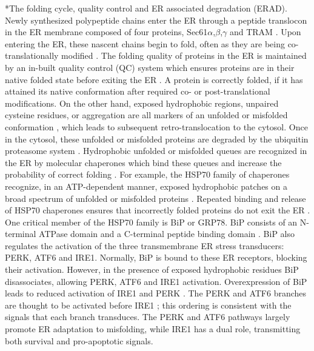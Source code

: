 \documentclass[12pt]{article}
\makeatletter
\renewcommand\subsection{\@startsection
	{subsection}{2}{0mm}
	{-0.05in}
	{-0.5\baselineskip}
	{\normalfont\normalsize\bfseries}}
\makeatother
\begin{document}
\subsection*{The folding cycle, quality control and ER associated degradation (ERAD).} 
Newly synthesized polypeptide chains enter the ER through a peptide translocon in the ER membrane composed of four proteins, Sec61$\alpha$,$\beta$,$\gamma$ and TRAM \citep{Matlack:1998kx}. 
Upon entering the ER, these nascent chains begin to fold, often as they are being co-translationally modified \citep{Fedorov:1997ys}. The folding quality of proteins in the ER is maintained by an in-built quality control (QC) system which ensures proteins are in their native folded state before exiting the ER \citep{ellgaard1999ssq,ellgaard2003qce}. A protein is correctly folded, if it has attained its native conformation after required co- or post-translational modifications. On the other hand, exposed hydrophobic regions, unpaired cysteine residues, or aggregation are all markers of an unfolded or misfolded conformation \citep{ellgaard1999ssq}, which leads to subsequent retro-translocation to the cytosol. Once in the cytosol, these unfolded or misfolded proteins are degraded by the ubiquitin proteasome system \citep{Hershko:2000kl}. Hydrophobic unfolded or misfolded queues are recognized in the ER by molecular chaperones which bind these queues and increase the probability of correct folding \citep{fra1993qce,helenius1997cca,hellman1999vab}. For example, the HSP70 family of chaperones recognize, in an ATP-dependent manner, exposed hydrophobic patches on a broad spectrum of unfolded or misfolded proteins \citep{kaufman2002unfolded}. Repeated binding and release of HSP70 chaperones ensures that incorrectly folded proteins do not exit the ER \citep{kaufman2002unfolded}. One critical member of the HSP70 family is BiP or GRP78. BiP consists of an N-terminal ATPase domain and a C-terminal peptide binding domain \citep{GETHING1999}. BiP also regulates the activation of the three transmembrane ER stress transducers: PERK, ATF6 and IRE1. Normally, BiP is bound to these ER receptors, blocking their activation. However, in the presence of exposed hydrophobic residues BiP disassociates, allowing PERK, ATF6 and IRE1 activation. Overexpression of BiP leads to reduced activation of IRE1 and PERK \citep{bertolotti2000dib,kohno1993pry}. The PERK and ATF6 branches are thought to be activated before IRE1 \citep{szegezdi2006mediators}; this ordering is consistent with the signals that each branch transduces. The PERK and ATF6 pathways largely promote ER adaptation to misfolding, while IRE1 has a dual role, transmitting both survival and pro-apoptotic signals.
\end{document}
